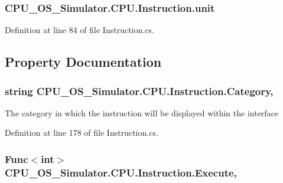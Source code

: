 \subsubsection[{unit}]{ C\+P\+U\+\_\+\+O\+S\+\_\+\+Simulator.\+C\+P\+U.\+Instruction.\+unit\hspace{0.3cm}{\ttfamily [private]}}\label{class_c_p_u___o_s___simulator_1_1_c_p_u_1_1_instruction_a0337c93fbfb5993eab37f1d052ca5f43}


Definition at line 84 of file Instruction.\+cs.



\subsection{Property Documentation}
\hypertarget{class_c_p_u___o_s___simulator_1_1_c_p_u_1_1_instruction_a7b7c3068cebbf81c64b67496b20c733a}{}
\subsubsection[{Category}]{\setlength{\rightskip}{0pt plus 5cm}string C\+P\+U\+\_\+\+O\+S\+\_\+\+Simulator.\+C\+P\+U.\+Instruction.\+Category\hspace{0.3cm}{\ttfamily [get]}, {\ttfamily [set]}}\label{class_c_p_u___o_s___simulator_1_1_c_p_u_1_1_instruction_a7b7c3068cebbf81c64b67496b20c733a}


The category in which the instruction will be displayed within the interface 



Definition at line 178 of file Instruction.\+cs.

\hypertarget{class_c_p_u___o_s___simulator_1_1_c_p_u_1_1_instruction_afc4c52737c07181195a29413cf09d2a5}{}
\subsubsection[{Execute}]{\setlength{\rightskip}{0pt plus 5cm}Func$<$int$>$ C\+P\+U\+\_\+\+O\+S\+\_\+\+Simulator.\+C\+P\+U.\+Instruction.\+Execute\hspace{0.3cm}{\ttfamily [get]}, {\ttfamily [set]}}\label{class_c_p_u___o_s___simulator_1_1_c_p_u_1_1_instruction_afc4c52737c07181195a29413cf09d2a5}


